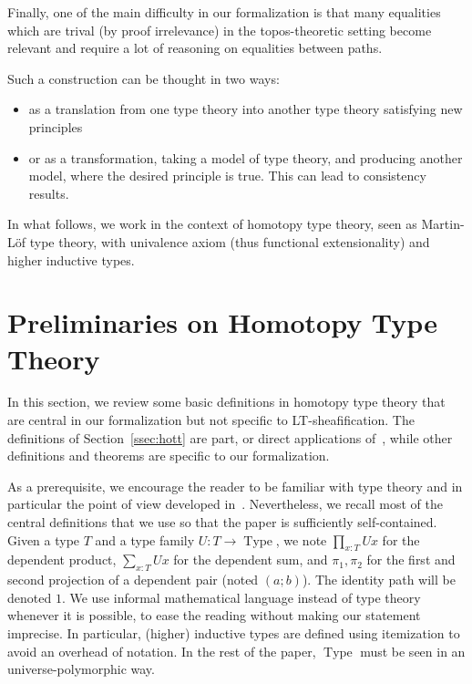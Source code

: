 \documentclass[preprint,9pt,numbers]{sigplanconf}
\DeclareMathOperator{\Type}{Type}
\begin{document}
Finally, one of the main difficulty in our formalization is that many
equalities which are trival (by proof irrelevance) in the topos-theoretic
setting become relevant and require a lot of reasoning on equalities
between paths.

Such a construction can be thought in two ways:
\begin{itemize}
\item as a translation from one type theory into another type theory
  satisfying new principles
\item or as a transformation, taking a model of type theory, and
  producing another model, where the desired principle is true. This
  can lead to consistency results.
\end{itemize}

In what follows, we work in the context of homotopy type theory, seen
as Martin-Löf type theory, with univalence axiom (thus functional
extensionality) and higher inductive types.



\section{Preliminaries on Homotopy Type Theory}
\label{sec:hott}

In this section, we review some basic definitions in homotopy type
theory that are central in our formalization but not specific to
LT-sheafification. 
The definitions of Section~\ref{ssec:hott} 
are part, or direct applications of~\cite{hottbook}, while other definitions
and theorems are specific to our formalization. 

As a prerequisite, we encourage the reader to be familiar with type theory and
in particular the point of view developed
in~\cite{hottbook}. Nevertheless, we recall most of the central definitions 
that we use so that the paper is sufficiently self-contained.
%
Given a type $T$ and a type family $U : T \to \Type$, we note
$\prod_{x:T} U x$ for the dependent product, $\sum_{x:T} U x$ for the dependent
sum, and $\pi_1, \pi_2$ for the first and second projection of a
dependent pair (noted $(a;b)$). The identity path will be denoted
$1$. We use informal mathematical language
instead of type theory whenever it is possible, to ease the reading
without making our statement imprecise. In particular, (higher)
inductive types are defined using itemization to avoid an overhead of
notation. In the rest of the paper, $\Type$ must be seen in an
universe-polymorphic way.
\end{document}
